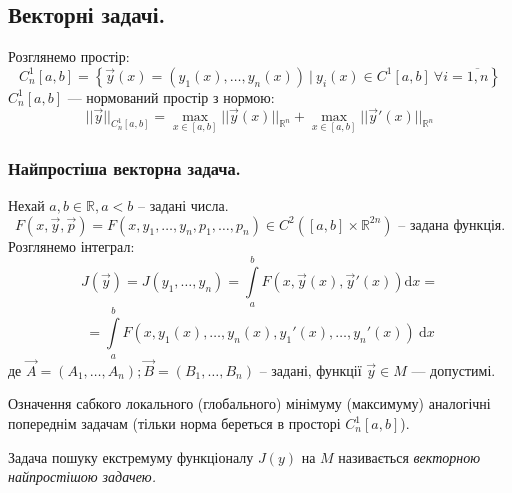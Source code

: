 \subsection{Векторні задачі.}
Розглянемо простір:
$$
C_n^1[a,b] = \left\lbrace \overrightarrow{y} (x) = (y_1(x), \dots , y_n(x)) \ \bigg| \  y_i(x) \in C^1[a,b] \ \forall i = \overline{1, n} \right\rbrace
$$
$
C_n^1 [a,b]
$ --- нормований простір з нормою:
$$
||\overrightarrow{y}||_{C_n^1 [a,b] } = \max\limits_{x\in[a,b]}||\overrightarrow{y}(x)||_{\mathbb{R}^n} +
 \max\limits_{x\in[a,b]}||\overrightarrow{y}'(x)||_{\mathbb{R}^n}
$$
\subsubsection{Найпростіша векторна задача.}
Нехай $a,b \in \mathbb{R} , a < b$ -- задані числа.
$$
F(x, \overrightarrow{y}, \overrightarrow{p}) = F(x, y_1, \dots, y_n, p_1, \dots, p_n)\in C^2 ([a,b] \times \mathbb{R}^{2n}) \text{ -- задана функція.}
$$
Розглянемо інтеграл:
$$
J(\overrightarrow{y}) = J(y_1, \dots, y_n) =  \int\limits_{a}^{b}{F(x,\overrightarrow{y}(x), \overrightarrow{y}'(x)) \mathrm{d} x} =
$$
$$
=  \int\limits_{a}^{ b}{ F(x, y_1 (x), \dots, y_n(x), y_1'(x), \dots, y_n'(x)) \ \mathrm{d} x}
$$
де $\overrightarrow{A} = (A_1, \dots , A_n) ; \overrightarrow{B} = (B_1, \dots , B_n)$ -- задані, функції $\overrightarrow{y} \in M$ --- допустимі. \par
Означення сабкого локального (глобального) мінімуму (максимуму) аналогічні попереднім задачам (тільки норма береться в просторі $C_n^1[a,b]$).
\begin{defo}
 Задача пошуку екстремуму функціоналу $J(y)$ на $M$ називається \textit{векторною найпростішою задачею.}
\end{defo}

